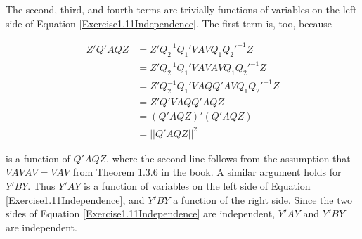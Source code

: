 \documentclass{article}
\begin{document}
The second, third, and fourth terms are trivially functions of variables on the left side of Equation \ref{Exercise1.11Independence}. The first term is, too, because

\begin{align*}
Z'Q'AQZ &= Z'Q_2^{-1}Q_1'VAVQ_1Q_2'^{-1}Z \\
&= Z'Q_2^{-1}Q_1'VAVAVQ_1Q_2'^{-1}Z \\
&= Z'Q_2^{-1}Q_1'VAQQ'AVQ_1Q_2'^{-1}Z \\
&= Z'Q'VAQQ'AQZ \\
&= (Q'AQZ)'(Q'AQZ) \\
&= ||Q'AQZ||^2
\end{align*}

is a function of $Q'AQZ$, where the second line follows from the assumption that $VAVAV=VAV$ from Theorem 1.3.6 in the book. A similar argument holds for $Y'BY$. Thus $Y'AY$ is a function of variables on the left side of Equation \ref{Exercise1.11Independence}, and $Y'BY$ a function of the right side. Since the two sides of Equation \ref{Exercise1.11Independence} are independent, $Y'AY$ and $Y'BY$ are independent.
\end{document}
